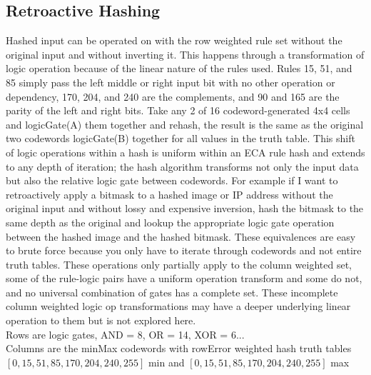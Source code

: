 \documentclass[11pt]{article}
\begin{document}
\subsection{Retroactive Hashing}
Hashed input can be operated on with the row weighted rule set without the original input and without inverting it. This happens through a transformation of logic operation because of the linear nature of the rules used. Rules 15, 51, and 85 simply pass the left middle or right input bit with no other operation or dependency, 170, 204, and 240 are the complements, and 90 and 165 are the parity of the left and right bits. Take any 2 of 16 codeword-generated 4x4 cells and logicGate(A) them together and rehash, the result is the same as the original two codewords logicGate(B) together for all values in the truth table. This shift of logic operations within a hash is uniform within an ECA rule hash and extends to any depth of iteration; the hash algorithm transforms not only the input data but also the relative logic gate between codewords. For example if I want to retroactively apply a bitmask to a hashed image or IP address without the original input and without lossy and expensive inversion, hash the bitmask to the same depth as the original and lookup the appropriate logic gate operation between the hashed image and the hashed bitmask. These equivalences are easy to brute force because you only have to iterate through codewords and not entire truth tables. These operations only partially apply to the column weighted set, some of the rule-logic pairs have a uniform operation transform and some do not, and no universal combination of gates has a complete set.  These incomplete column weighted logic op transformations may have a deeper underlying linear operation to them but is not explored here.\\

Rows are logic gates, AND = 8, OR = 14, XOR = 6...\\
Columns are the minMax codewords with rowError weighted hash truth tables\\
$[0,15,51,85,170,204,240,255]$ min and $[0,15,51,85,170,204,240,255]$ max\\
\end{document}
